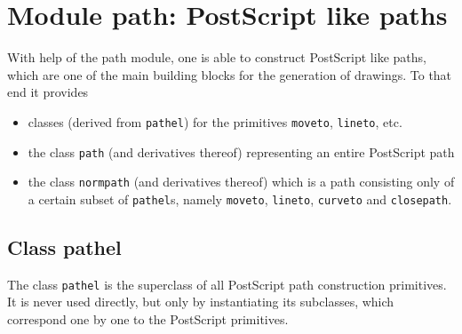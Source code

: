\chapter{Module path: PostScript like paths}

\label{path}

With help of the path module, one is able to construct PostScript like 
paths, which are one of the main building blocks for the generation of 
drawings. To that end it provides 
\begin{itemize}
\item classes (derived from \verb|pathel|) for the primitives \verb|moveto|, \verb|lineto|, etc.
\item the class \verb|path| (and derivatives thereof) representing an
  entire PostScript path
\item the class \verb|normpath| (and derivatives thereof) which is a
  path consisting only of a certain subset of \verb|pathel|s, namely 
  \verb|moveto|, \verb|lineto|, \verb|curveto| and \verb|closepath|.
\end{itemize}

\section{Class pathel}

The class \verb|pathel| is the superclass of all PostScript path
construction primitives. It is never used directly, but only by
instantiating its subclasses, which correspond one by one to the
PostScript primitives.

